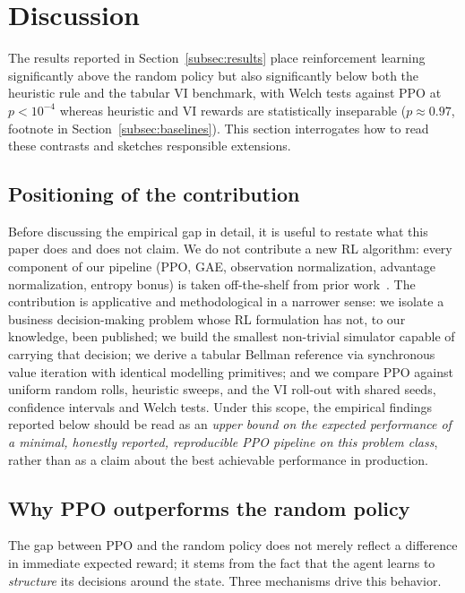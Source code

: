 \section{Discussion}
\label{sec:discussion}

The results reported in Section~\ref{subsec:results} place reinforcement
learning significantly above the random policy but also significantly
below both the heuristic rule and the tabular VI benchmark, with Welch tests
against PPO at $p < 10^{-4}$ whereas heuristic and VI rewards are statistically
inseparable ($p \approx 0.97$, footnote in Section~\ref{subsec:baselines}). This section interrogates how to read these contrasts and sketches responsible extensions.


\subsection{Positioning of the contribution}
\label{subsec:positioning}

Before discussing the empirical gap in detail, it is useful to restate
what this paper does and does not claim. We do not contribute a new RL
algorithm: every component of our pipeline (PPO, GAE, observation
normalization, advantage normalization, entropy bonus) is taken
off-the-shelf from prior work~\cite{schulman2017ppo,schulman2016gae,
andrychowicz2021matters}. The contribution is applicative and
methodological in a narrower sense: we isolate a business
decision-making problem whose RL formulation has not, to our knowledge,
been published; we build the smallest non-trivial simulator capable of
carrying that decision; we derive a tabular Bellman reference via synchronous
value iteration with identical modelling primitives; and we compare PPO against
uniform random rolls, heuristic sweeps, and the VI roll-out with shared seeds,
confidence intervals and Welch tests.
Under this scope, the empirical findings reported below should be read
as an \emph{upper bound on the expected performance of a minimal,
honestly reported, reproducible PPO pipeline on this problem class},
rather than as a claim about the best achievable performance in
production.


\subsection{Why PPO outperforms the random policy}
\label{subsec:why-ppo-beats-random}

The gap between PPO and the random policy does not merely reflect a
difference in immediate expected reward; it stems from the fact that the
agent learns to \emph{structure} its decisions around the state. Three
mechanisms drive this behavior.

